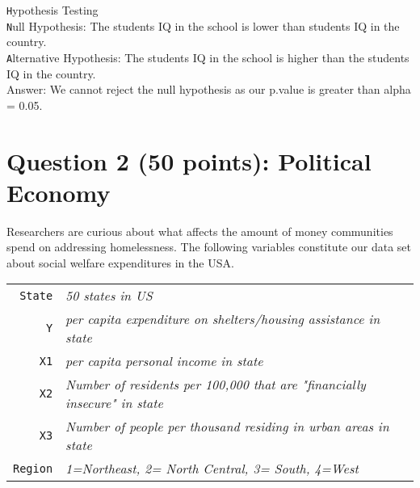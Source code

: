 \documentclass[12pt,letterpaper]{article}
\begin{document}
\begin{enumerate}

\texttt Hypothesis Testing\\ 
\texttt Null Hypothesis: The students IQ in the school is lower than students IQ in the country.\\ 
\texttt Alternative Hypothesis: The students IQ in the school is higher than the students IQ in the country.\\ 



\noindent Answer: We cannot reject the null hypothesis as our p.value is greater than alpha = 0.05.\\
\vspace{.5cm}
\end{enumerate}

\newpage

\section*{Question 2 (50 points): Political Economy}

\noindent Researchers are curious about what affects the amount of money communities spend on addressing homelessness. The following variables constitute our data set about social welfare expenditures in the USA. \\
\vspace{.5cm}


\begin{tabular}{r|l}
	\texttt{State} &\emph{50 states in US} \\
	\texttt{Y} & \emph{per capita expenditure on shelters/housing assistance in state}\\
	\texttt{X1} &\emph{per capita personal income in state} \\
	\texttt{X2} &  \emph{Number of residents per 100,000 that are "financially insecure" in state}\\
	\texttt{X3} &  \emph{Number of people per thousand residing in urban areas in state} \\
	\texttt{Region} &  \emph{1=Northeast, 2= North Central, 3= South, 4=West} \\
\end{tabular}
\end{document}

